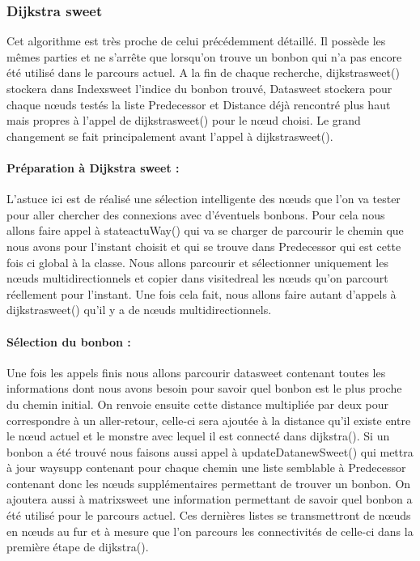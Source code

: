 \documentclass[12pt, oneside]{article}
\begin{document}
\subsubsection{Dijkstra sweet}
Cet algorithme est très proche de celui précédemment détaillé. Il possède les mêmes parties et ne s’arrête que lorsqu’on trouve un bonbon qui n’a pas encore été utilisé dans le parcours actuel. A la fin de chaque recherche, dijkstra\textunderscore sweet() stockera dans Index\textunderscore sweet l’indice du bonbon trouvé, Data\textunderscore sweet stockera pour chaque nœuds testés la liste Predecessor et Distance déjà rencontré plus haut mais propres à l’appel de dijkstra\textunderscore sweet() pour le nœud choisi.
Le grand changement se fait principalement avant l’appel à dijkstra\textunderscore sweet().
\paragraph{Préparation à Dijkstra sweet :}
L’astuce ici est de réalisé une sélection intelligente des nœuds que l’on va tester pour aller chercher des connexions avec d’éventuels bonbons.
Pour cela nous allons faire appel à state\textunderscore actuWay() qui va se charger de parcourir le chemin que nous avons pour l’instant choisit et qui se trouve dans Predecessor qui est cette fois ci global à la classe. Nous allons parcourir et sélectionner uniquement les nœuds multidirectionnels et copier dans visited\textunderscore real les nœuds qu’on parcourt réellement pour l’instant. Une fois cela fait, nous allons faire autant d’appels à dijkstra\textunderscore sweet() qu’il y a de nœuds multidirectionnels.

\paragraph{Sélection du bonbon :}
Une fois les appels finis nous allons parcourir data\textunderscore sweet contenant toutes les informations dont nous avons besoin pour savoir quel bonbon est le plus proche du chemin initial. On renvoie ensuite cette distance multipliée par deux pour correspondre à un aller-retour, celle-ci sera ajoutée à la distance qu’il existe entre le nœud actuel et le monstre avec lequel il est connecté dans dijkstra().
Si un bonbon a été trouvé nous faisons aussi appel à updateData\textunderscore newSweet() qui mettra à jour way\textunderscore supp contenant pour chaque chemin une liste semblable à Predecessor contenant donc les nœuds supplémentaires permettant de trouver un bonbon. On ajoutera aussi à matrix\textunderscore sweet une information permettant de savoir quel bonbon a été utilisé pour le parcours actuel. Ces dernières listes se transmettront de nœuds en nœuds au fur et à mesure que l’on parcours les connectivités de celle-ci dans la première étape de dijkstra().
\end{document}
